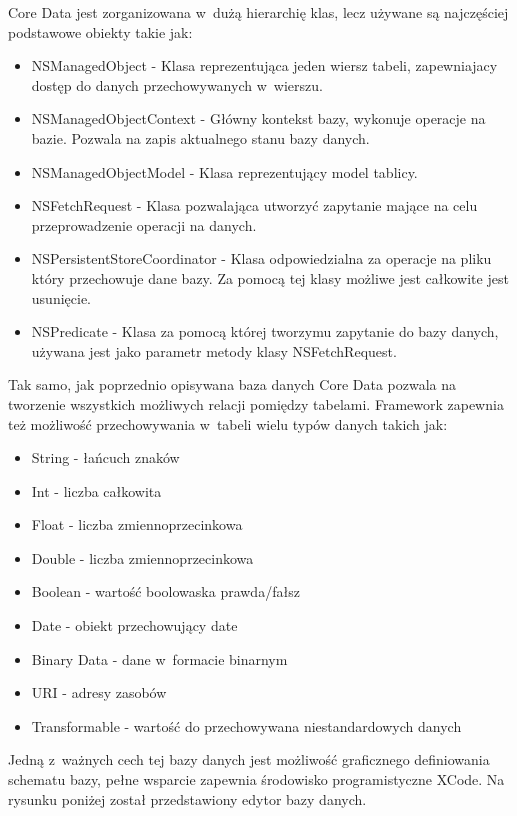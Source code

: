 Core Data jest zorganizowana w~dużą hierarchię klas, lecz używane są najczęściej podstawowe obiekty takie jak: 

\begin{itemize}
	\item NSManagedObject - Klasa reprezentująca jeden wiersz tabeli, zapewniajacy dostęp do danych przechowywanych w~wierszu.
	\item NSManagedObjectContext - Główny kontekst bazy, wykonuje operacje na bazie. Pozwala na zapis aktualnego stanu bazy danych.
	\item NSManagedObjectModel	- Klasa reprezentujący model tablicy. 
	\item NSFetchRequest - Klasa pozwalająca utworzyć zapytanie mające na celu przeprowadzenie operacji na danych.
	\item NSPersistentStoreCoordinator - Klasa odpowiedzialna za operacje na pliku który przechowuje dane bazy. Za pomocą tej klasy możliwe jest całkowite jest usunięcie. 
	\item NSPredicate - Klasa za pomocą której tworzymu zapytanie do bazy danych, używana jest jako parametr metody klasy NSFetchRequest.
\end{itemize}

Tak samo, jak poprzednio opisywana baza danych Core Data pozwala na tworzenie wszystkich możliwych relacji pomiędzy tabelami. Framework zapewnia też możliwość przechowywania w~tabeli wielu typów danych takich jak: 

\begin{itemize}
	\item String - łańcuch znaków
	\item Int - liczba całkowita
	\item Float - liczba zmiennoprzecinkowa
	\item Double  - liczba zmiennoprzecinkowa
	\item Boolean - wartość boolowaska prawda/fałsz 
	\item Date - obiekt przechowujący date
	\item Binary Data - dane w~formacie binarnym 
	\item URI - adresy zasobów
	\item Transformable - wartość do przechowywana niestandardowych danych 
\end{itemize}

Jedną z~ważnych cech tej bazy danych jest możliwość graficznego definiowania schematu bazy, pełne wsparcie zapewnia środowisko programistyczne XCode. Na rysunku  poniżej został przedstawiony edytor bazy danych. \par

